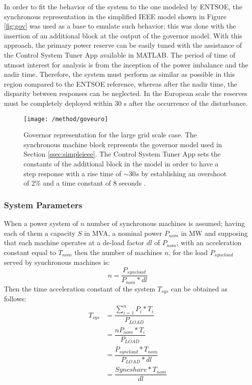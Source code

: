 In order to fit the behavior of the system to the one modeled by ENTSOE, the synchronous representation in the simplified IEEE model shown in Figure \ref{fig:gov} was used as a base to emulate such behavior; this was done with the insertion of an additional block at the output of the governor model. With this approach, the primary power reserve can be easily tuned with the assistance of the Control System Tuner App available in MATLAB. The period of time of utmost interest for analysis is from the inception of the power imbalance and the nadir time. Therefore, the system must perform as similar as possible in this region compared to the ENTSOE reference, whereas after the nadir time, the disparity between responses can be neglected. In the European scale the reserves must be completely deployed within 30 s after the occurrence of the disturbance. 

\begin{figure}[h]
	\centering
	\texttt{[image: /method/goveuro]}
	\caption{Governor representation for the large grid scale case. The synchronous machine block represents the governor model used in Section \ref{ssec:simpleieee}. The Control System Tuner App sets the constants of the additional block in the model in order to have a step response with a rise time of $ \sim30s $ by establishing an overshoot of 2\%  and a time constant of 8 seconds \cite{ogata1999ingenieria}.}
	\label{fig:goveuro}
\end{figure}




\subsubsection{System Parameters}

When a power system of $ n $ number of synchronous machines is assumed; having each of them a capacity $ S $ in MVA, a nominal power $ P_{nom} $ in MW and
supposing that each machine operates at a de-load factor $ dl $ of $ P_{nom} $; with an acceleration constant equal to $ T_{nom} $ then the number of machines $ n $, for the load $ P_{syncload} $ served by synchronous machines is:
\begin{equation}
	n=\dfrac{P_{syncload}}{P_{nom}*dl}
\end{equation}
Then the time acceleration constant of the system $ T_{sys} $ can be obtained as follows:
\begin{align}
	T_{sys} &=\dfrac{\sum_{i=1}^nP_i*T_i}{P_{LOAD}}\nonumber  \\
	 &=\dfrac{nP_{nom}*T_i}{P_{LOAD}}\nonumber \\
	&=\dfrac{P_{syncload}*T_{nom}}{P_{LOAD}*dl}\nonumber\\
		&=\dfrac{Sync share*T_{nom}}{dl} \label{eq:tsyseuro}
\end{align}




